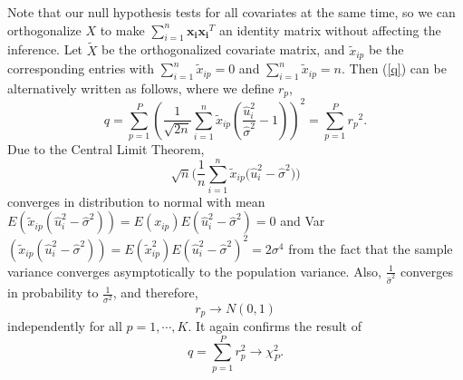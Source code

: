 \documentclass[12pt]{extarticle}
\theoremstyle{theorem}
\begin{document}
\noindent
Note that our null hypothesis tests for all covariates at the same time, so we can orthogonalize $X$ to make $\sum_{i=1}^{n} \bm{x_i} \bm{x_i}^T$ an identity matrix without affecting the inference. Let $\tilde{X}$ be the orthogonalized covariate matrix, and $\tilde{x}_{ip}$ be the corresponding entries with $\sum_{i=1}^{n}\tilde{x}_{ip} = 0$ and $\sum_{i=1}^{n} \tilde{x}_{ip}  = n$. Then (\ref{q}) can be alternatively written as follows, where we define $r_{p}$,
\begin{equation}
q = \sum_{p=1}^{P} \left( \frac{1}{\sqrt{2n}}\sum_{i=1}^{n} \tilde{x}_{ip} \left( \frac{\hat{u}^2_{i}}{\hat{\sigma}^2} - 1 \right) \right)^2 = \sum_{p=1}^P {r_{p}}^2.
\label{r}
\end{equation}
Due to the Central Limit Theorem, $$\sqrt{n} \bigg( \frac{1}{n} \sum_{i=1}^{n} \tilde{x}_{ip} \bigg( \hat{u}_{i}^2 - \hat{\sigma}^2 \bigg) \bigg)$$ converges in distribution to normal with mean $E(\tilde{x}_{ip}(\hat{u}_{i}^2 - \hat{\sigma}^2)) = E(x_{ip}) E(\hat{u}_{i}^2 - \hat{\sigma}^2) = 0$ and Var$(\tilde{x}_{ip} (\hat{u}_{i}^2 - \hat{\sigma}^2)) = E(\tilde{x}_{ip}^2) E(\hat{u}_{i}^2 - \hat{\sigma}^2)^2 = 2\sigma^4$ from the fact that the sample variance converges asymptotically to the population variance. Also, $\frac{1}{\hat{\sigma}^2}$ converges in probability to $\frac{1}{\sigma^2}$, and therefore,
\begin{equation*}
r_{p} \rightarrow N(0,1)
\end{equation*}
independently for all $p = 1, \cdots, K$. It again confirms the result of
\begin{equation*}
q = \sum_{p = 1}^{P} r_{p}^2  \rightarrow \chi^2_{P}.
\end{equation*}
\end{document}
